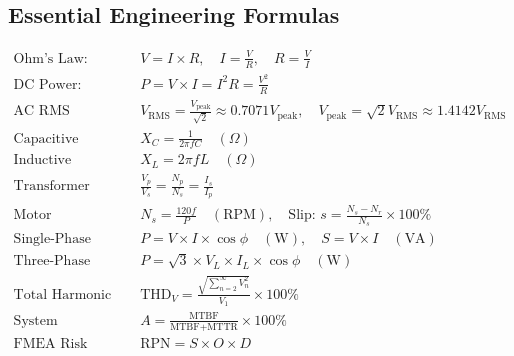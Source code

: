 \subsection{Essential Engineering Formulas}
\begin{align*}
\text{Ohm's Law:} &\quad V = I \times R, \quad I = \frac{V}{R}, \quad R = \frac{V}{I} \\
\text{DC Power:} &\quad P = V \times I = I^2 R = \frac{V^2}{R} \\
\text{AC RMS \& Peak:} &\quad V_{\text{RMS}} = \frac{V_{\text{peak}}}{\sqrt{2}} \approx 0.7071 V_{\text{peak}}, \quad V_{\text{peak}} = \sqrt{2} V_{\text{RMS}} \approx 1.4142 V_{\text{RMS}} \\
\text{Capacitive Reactance:} &\quad X_C = \frac{1}{2\pi f C} \quad (\Omega) \\
\text{Inductive Reactance:} &\quad X_L = 2\pi f L \quad (\Omega) \\
\text{Transformer Turns Ratio:} &\quad \frac{V_p}{V_s} = \frac{N_p}{N_s} = \frac{I_s}{I_p} \\
\text{Motor Synchronous Speed:} &\quad N_s = \frac{120 f}{P} \quad (\text{RPM}), \quad \text{Slip: } s = \frac{N_s - N_r}{N_s} \times 100\% \\
\text{Single-Phase AC Power:} &\quad P = V \times I \times \cos\phi \quad (\text{W}), \quad S = V \times I \quad (\text{VA}) \\
\text{Three-Phase AC Power:} &\quad P = \sqrt{3} \times V_L \times I_L \times \cos\phi \quad (\text{W}) \\
\text{Total Harmonic Distortion:} &\quad \text{THD}_V = \frac{\sqrt{\sum_{n=2}^{\infty} V_n^2}}{V_1} \times 100\% \\
\text{System Availability:} &\quad A = \frac{\text{MTBF}}{\text{MTBF} + \text{MTTR}} \times 100\% \\
\text{FMEA Risk Priority:} &\quad \text{RPN} = S \times O \times D
\end{align*}

